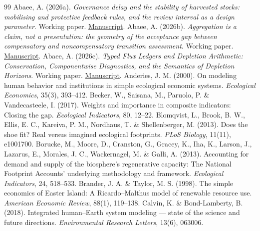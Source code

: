 \documentclass[preprint,12pt,authoryear]{elsarticle}
\begin{document}
\begin{thebibliography}{99}
 Abaee, A. (2026a). \emph{Governance delay and the stability of harvested stocks: mobilising and protective feedback rules, and the review interval as a design parameter}. Working paper. \href{https://github.com/MIKEAA2020/general-sustainability/blob/2efaa62083f2007dec3446c15c475af88f0925f3/arena%20agent%201/paper%20rewrites/latex/paper4_delay_dynamics_v41.pdf}{Manuscript}.
 Abaee, A. (2026b). \emph{Aggregation is a claim, not a presentation: the geometry of the acceptance gap between compensatory and noncompensatory transition assessment}. Working paper. \href{https://github.com/MIKEAA2020/general-sustainability/blob/2efaa62083f2007dec3446c15c475af88f0925f3/arena%20agent%201/paper%20rewrites/latex/paper06_assessment_separation_v71.pdf}{Manuscript}.
 Abaee, A. (2026c). \emph{Typed Flux Ledgers and Depletion Arithmetic: Conservation, Componentwise Diagnostics, and the Semantics of Depletion Horizons}. Working paper. \href{https://github.com/MIKEAA2020/general-sustainability/blob/2efaa62083f2007dec3446c15c475af88f0925f3/paper3/latest-2026-09-19/manuscript/paper3_material_ledgers_v50.pdf}{Manuscript}.
 Anderies, J. M. (2000). On modeling human behavior and institutions in simple ecological economic systems. \emph{Ecological Economics}, 35(3), 393--412.
 Becker, W., Saisana, M., Paruolo, P. \& Vandecasteele, I. (2017). Weights and importance in composite indicators: Closing the gap. \emph{Ecological Indicators}, 80, 12--22.
 Blomqvist, L., Brook, B. W., Ellis, E. C., Kareiva, P. M., Nordhaus, T. \& Shellenberger, M. (2013). Does the shoe fit? Real versus imagined ecological footprints. \emph{PLoS Biology}, 11(11), e1001700.
 Borucke, M., Moore, D., Cranston, G., Gracey, K., Iha, K., Larson, J., Lazarus, E., Morales, J. C., Wackernagel, M. \& Galli, A. (2013). Accounting for demand and supply of the biosphere's regenerative capacity: The National Footprint Accounts' underlying methodology and framework. \emph{Ecological Indicators}, 24, 518--533.
 Brander, J. A. \& Taylor, M. S. (1998). The simple economics of Easter Island: A Ricardo--Malthus model of renewable resource use. \emph{American Economic Review}, 88(1), 119--138.
 Calvin, K. \& Bond-Lamberty, B. (2018). Integrated human--Earth system modeling --- state of the science and future directions. \emph{Environmental Research Letters}, 13(6), 063006.

\end{thebibliography}
\end{document}
